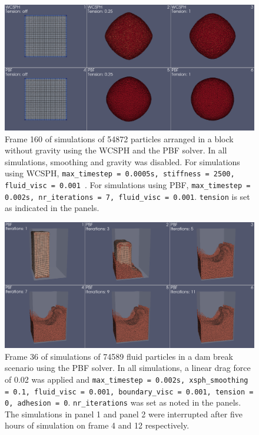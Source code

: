 \documentclass[11pt, letterpaper, twocolumn]{article}
\begin{document}
\begin{figure}
  \centering
  \includegraphics[width=\textwidth]{images/tension.0053.png}
  \caption{Frame 160 of simulations of 54872 particles arranged in a block without gravity using the WCSPH and the PBF solver. In all simulations, smoothing and gravity was disabled. For simulations using WCSPH, \texttt{max\_timestep = 0.0005s, stiffness = 2500, fluid\_visc = 0.001 }. 
  For simulations using PBF, \texttt{max\_timestep = 0.002s, nr\_iterations = 7, fluid\_visc = 0.001}. \texttt{tension} is set as indicated in the panels.}
  \label{fig:tension}
\end{figure}

\begin{figure}
  \centering
  \includegraphics[width=\textwidth]{images/iterations.0036.png}
  \caption{Frame 36 of simulations of 74589 fluid particles in a dam break scenario using the PBF solver. In all simulations, a linear drag force of 0.02 was applied and \texttt{max\_timestep = 0.002s, xsph\_smoothing = 0.1, fluid\_visc = 0.001, boundary\_visc = 0.001, tension = 0, adhesion = 0}. \texttt{nr\_iterations} was 
  set as noted in the panels. The simulations in panel 1 and panel 2 were interrupted after five hours of simulation on frame 4 and 12 respectively.}
  \label{fig:dam_comparisons_iterations}
\end{figure}
\end{document}
